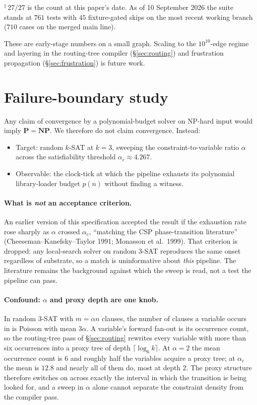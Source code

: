 \documentclass[11pt]{article}
\begin{document}
\noindent$^{\ddagger}$\,$27/27$ is the count at this paper's date. As
of 10 September 2026 the suite stands at $761$ tests with $45$
fixture-gated skips on the most recent working branch ($710$ cases on
the merged main line).

These are early-stage numbers on a small graph. Scaling to the
$10^{10}$-edge regime and layering in the routing-tree compiler
(\S\ref{sec:routing}) and frustration propagation
(\S\ref{sec:frustration}) is future work.

\section{Failure-boundary study}
\label{sec:failboundary}

Any claim of convergence by a polynomial-budget solver on NP-hard
input would imply $\mathbf{P}=\mathbf{NP}$. We therefore do not
claim convergence. Instead:

\begin{itemize}[label={--},leftmargin=1.6em]
  \item Target: random $k$-SAT at $k=3$, sweeping the
        constraint-to-variable ratio $\alpha$ across the satisfiability
        threshold $\alpha_c \approx 4.267$.
  \item Observable: the clock-tick at which the pipeline exhausts its
        polynomial library-loader budget $p(n)$ without finding a
        witness.
\end{itemize}

\paragraph{What is \emph{not} an acceptance criterion.} An earlier
version of this specification accepted the result if the exhaustion
rate rose sharply as $\alpha$ crossed $\alpha_c$, ``matching the CSP
phase-transition literature'' (Cheeseman--Kanefsky--Taylor 1991;
Monasson et al.\ 1999). That criterion is dropped: any local-search
solver on random 3-SAT reproduces the same onset regardless of
substrate, so a match is uninformative about \emph{this} pipeline. The
literature remains the background against which the sweep is read, not
a test the pipeline can pass.

\paragraph{Confound: $\alpha$ and proxy depth are one knob.} In random
3-SAT with $m = \alpha n$ clauses, the number of clauses a variable
occurs in is Poisson with mean $3\alpha$. A variable's forward fan-out
is its occurrence count, so the routing-tree pass of
\S\ref{sec:routing} rewrites every variable with more than six
occurrences into a proxy tree of depth $\lceil\log_6 k\rceil$. At
$\alpha = 2$ the mean occurrence count is $6$ and roughly half the
variables acquire a proxy tree; at $\alpha_c$ the mean is $12.8$ and
nearly all of them do, most at depth $2$. The proxy structure
therefore switches on across exactly the interval in which the
transition is being looked for, and a sweep in $\alpha$ alone cannot
separate the constraint density from the compiler pass.
\end{document}
